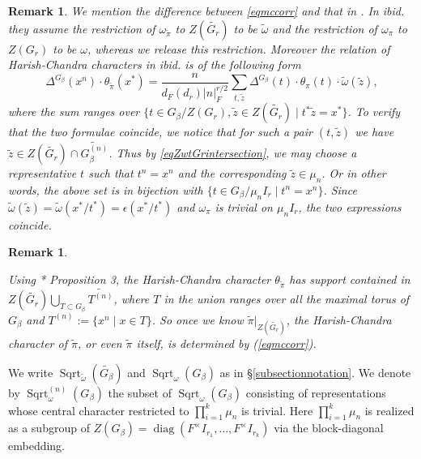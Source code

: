 \documentclass{amsart}
\numberwithin{equation}{section}
\newtheorem{remark}[theorem]{\bf{Remark}}
\newcommand{\abs}[1]{\left|#1\right|_{F}}
\newcommand{\rest}{\lvert}
\newcommand{\mrdiag}{\operatorname{diag}}
\newcommand{\mrsqrt}{\operatorname{Sqrt}}
\newcommand{\mrtemp}{\operatorname{Temp}}
\newcommand{\dF}[1]{d_{F}(#1)}
\newcommand{\wt}[1]{\widetilde{#1}}
\begin{document}
	\begin{remark}
		
		We mention the difference between \eqref{eqmccorr} and that in \cite{flicker1986metaplectic}. In \emph{ibid.} they assume the restriction of $\omega_{\wt{\pi}}$ to $Z(\wt{G_{r}})$ to be $\wt{\omega}$ and the restriction of $\omega_{\pi}$ to $Z(G_{r})$ to be $\omega$, whereas we release this restriction. Moreover the relation of Harish-Chandra characters in \emph{ibid.} is of the following form
		$$\Delta^{G_{\beta}}(x^{n})\cdot\theta_{\wt{\pi}}(x^{*})=\frac{n}{\dF{d_{r}}\abs{n}^{r/2}}\sum_{t,\wt{z}}\Delta^{G_{\beta}}(t)\cdot\theta_{\pi}(t)\cdot\wt{\omega}(\wt{z}),$$
		where the sum ranges over
		$\{t\in G_{\beta}/Z(G_{r}), \wt{z}\in Z(\wt{G_{r}})\mid t^{*}\wt{z}=x^{*}\}$.
		To verify that the two formulae coincide, we notice that for such a pair $(t,\wt{z})$ we have $\wt{z}\in Z(\wt{G_{r}})\cap\wt{G^{(n)}_{\beta}}$. Thus by \eqref{eqZwtGrintersection}, we may choose a representative $t$ such that $t^{n}=x^{n}$ and the corresponding $\wt{z}\in\mu_{n}$. Or in other words, the above set is in bijection with $\{t\in G_{\beta}/\mu_{n}I_{r}\mid t^{n}=x^{n}\}$. Since $\wt{\omega}(\wt{z})=\wt{\omega}(x^{*}/t^{*})=\epsilon(x^{*}/t^{*})$ and $\omega_{\pi}$ is trivial on $\mu_{n}I_{r}$, the two expressions coincide.
		
	\end{remark}
	
	\begin{remark}\label{remTrpitildesupp}
		
		Using \cite{flicker1986metaplectic}*{ Proposition 3}, the Harish-Chandra character $\theta_{\wt{\pi}}$ has support contained in $Z(\wt{G_{r}})\bigcup_{T\subset G_{\beta}}\wt{T^{(n)}}$, where $T$ in the union ranges over all the maximal torus of $G_{\beta}$ and $T^{(n)}:=\{x^{n}\mid x\in T\}$. So once we know $\wt{\pi}\rest_{Z(\wt{G_{r}})}$, the Harish-Chandra character of $\wt{\pi}$, or even $\wt{\pi}$ itself, is determined by (\ref{eqmccorr}). 
		
	\end{remark}
	
	We write $\mrsqrt_{\wt{\omega}}(\wt{G_{\beta}})$ %
	and $\mrsqrt_{\omega}(G_{\beta})$ %
	as in \S \ref{subsectionnotation}. We denote by $\mrsqrt^{(n)}_{\omega}(G_{\beta})$ %
	the subset of $\mrsqrt_{\omega}(G_{\beta})$ %
	consisting of representations whose central character restricted to $\prod_{i=1}^{k}\mu_{n}$ is trivial. Here $\prod_{i=1}^{k}\mu_{n}$ is realized as a subgroup of $Z(G_{\beta})=\mrdiag(F^{\times} I_{r_{1}},\dots ,F^{\times} I_{r_{k}})$ via the block-diagonal embedding.
	
\end{document}
